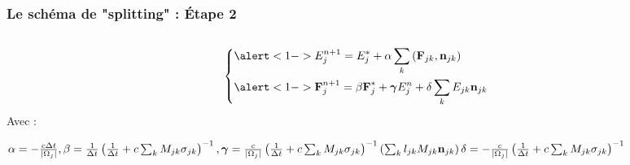 \begin{frame}
  \frametitle{Le schéma de "splitting" : Étape 2}   %
  \begin{columns}
    \begin{column}{0.6\textwidth}
      \begingroup
      \normalsize
      \begin{equation*} 
          \begin{dcases}
          \alert<1->{E_j^{n+1} = E_j^* + \alpha \sum_k \left( \bvec F_{jk}, \bvec n_{jk} \right)} \\
          \alert<1->{\bvec{F}_j^{n+1} = \beta \bvec F_j^* + \bm{\gamma} E_j^n + \delta \sum_k E_{jk} \bvec n_{jk}}
          \end{dcases}   
      \end{equation*}
      Avec :
      \newline
      \scriptsize
    
        $\alpha = -\frac{c \Delta t}{\left| \Omega_j \right|}, \linebreak
        \beta = \frac{1}{\Delta t} \left( \frac{1}{\Delta t} + c \sum_k M_{jk} \sigma_{jk} \right)^{-1}, \linebreak
        \bm{\gamma} = \frac{c}{\left| \Omega_j \right|} \left( \frac{1}{\Delta t} + c \sum_k M_{jk} \sigma_{jk} \right)^{-1} \left( \sum_k l_{jk} M_{jk} \bvec n_{jk} \right) \linebreak
        \delta = -\frac{c}{\left| \Omega_j \right|} \left( \frac{1}{\Delta t} + c \sum_k M_{jk} \sigma_{jk} \right)^{-1}$

    \endgroup
      

\end{column}
\end{columns}
\end{frame}

